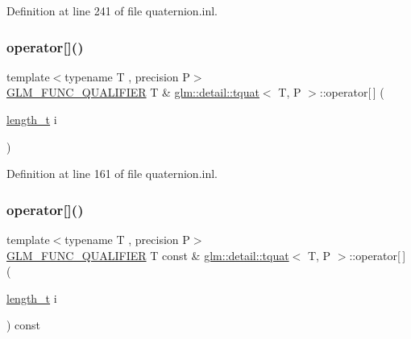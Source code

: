 Definition at line 241 of file quaternion.\+inl.

\mbox{\label{structglm_1_1detail_1_1tquat_ad4f23768ca2296f8e0f140a5f03cd404}} 
\subsubsection{\texorpdfstring{operator[]()}{operator[]()}\hspace{0.1cm}{\footnotesize\ttfamily [1/2]}}
{\footnotesize\ttfamily template$<$typename T , precision P$>$ \\
\hyperlink{setup_8hpp_a33fdea6f91c5f834105f7415e2a64407}{G\+L\+M\+\_\+\+F\+U\+N\+C\+\_\+\+Q\+U\+A\+L\+I\+F\+I\+ER} T \& \hyperlink{structglm_1_1detail_1_1tquat}{glm\+::detail\+::tquat}$<$ T, P $>$\+::operator\mbox{[}$\,$\mbox{]} (\begin{DoxyParamCaption}\item[{\hyperlink{namespaceglm_a090a0de2260835bee80e71a702492ed9}{length\+\_\+t}}]{i }\end{DoxyParamCaption})}



Definition at line 161 of file quaternion.\+inl.

\mbox{\label{structglm_1_1detail_1_1tquat_a7937f407f2db9ab422b7a23e30a88b6f}} 
\subsubsection{\texorpdfstring{operator[]()}{operator[]()}\hspace{0.1cm}{\footnotesize\ttfamily [2/2]}}
{\footnotesize\ttfamily template$<$typename T , precision P$>$ \\
\hyperlink{setup_8hpp_a33fdea6f91c5f834105f7415e2a64407}{G\+L\+M\+\_\+\+F\+U\+N\+C\+\_\+\+Q\+U\+A\+L\+I\+F\+I\+ER} T const  \& \hyperlink{structglm_1_1detail_1_1tquat}{glm\+::detail\+::tquat}$<$ T, P $>$\+::operator\mbox{[}$\,$\mbox{]} (\begin{DoxyParamCaption}\item[{\hyperlink{namespaceglm_a090a0de2260835bee80e71a702492ed9}{length\+\_\+t}}]{i }\end{DoxyParamCaption}) const}



